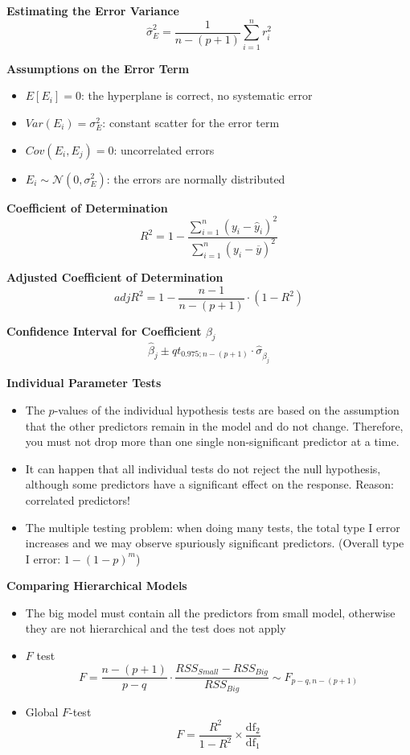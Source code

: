 \documentclass[a4paper]{article}
\begin{document}
\textbf{Estimating the Error Variance}
\[\hat{\sigma}_E^2=\frac{1}{n-(p+1)}\sum_{i=1}^n r_i^2 \]

\textbf{Assumptions on the Error Term}
\begin{itemize}
    \item $E[E_i]=0$: the hyperplane is correct, no systematic error
    \item $Var(E_i)=\sigma_E^2$: constant scatter for the error term
    \item $Cov(E_i,E_j)=0$: uncorrelated errors
    \item $E_i\sim\mathcal{N}(0,\sigma_E^2)$: the errors are normally distributed
\end{itemize}

\textbf{Coefficient of Determination}
\[R^2=1-\frac{\sum_{i=1}^n(y_i-\hat{y}_i)^2}{\sum_{i=1}^n(y_i-\overline{y})^2} \]

\textbf{Adjusted Coefficient of Determination}
\[adjR^2=1-\frac{n-1}{n-(p+1)}\cdot(1-R^2) \]

\textbf{Confidence Interval for Coefficient $\beta_j$}
\[\hat{\beta}_j\pm qt_{0.975;n-(p+1)}\cdot\hat{\sigma}_{\hat{\beta}_j} \]

\textbf{Individual Parameter Tests}
\begin{itemize}
    \item The $p$-values of the individual hypothesis tests are based on the assumption that the other predictors remain in the model and do not change. Therefore, you must not drop more than one single non-significant predictor at a time.
    \item It can happen that all individual tests do not reject the null hypothesis, although some predictors have a significant effect on the response. Reason: correlated predictors!
    \item The multiple testing problem: when doing many tests, the total type I error increases and we may observe spuriously significant predictors. (Overall type I error: $1-(1-p)^m$)
\end{itemize}

\textbf{Comparing Hierarchical Models}
\begin{itemize}
    \item The big model must contain all the predictors from small model, otherwise they are not hierarchical and the test does not apply
    \item $F$ test
    \[F=\frac{n-(p+1)}{p-q}\cdot\frac{RSS_{Small}-RSS_{Big}}{RSS_{Big}}\sim F_{p-q,n-(p+1)} \]
    \item Global $F$-test
    \[F=\frac{R^2}{1-R^2}\times\frac{\mathrm{df_2}}{\mathrm{df_1}} \]
\end{itemize}
\end{document}
